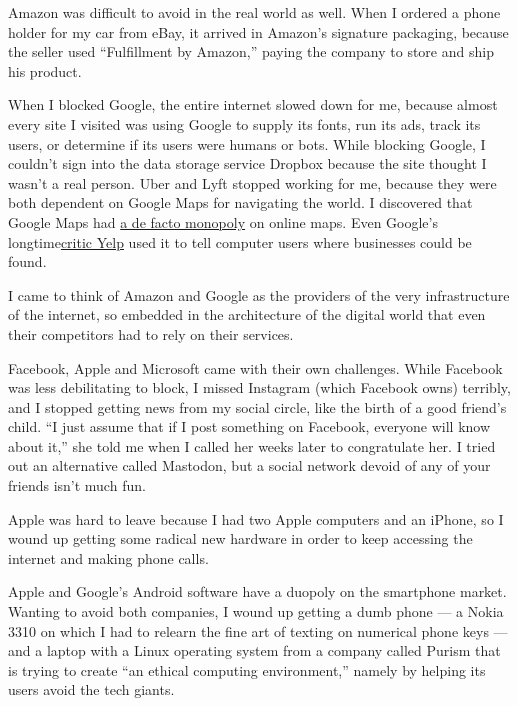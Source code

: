 Amazon was difficult to avoid in the real world as well. When I ordered
a phone holder for my car from eBay, it arrived in Amazon's signature
packaging, because the seller used ``Fulfillment by Amazon,'' paying the
company to store and ship his product.

When I blocked Google, the entire internet slowed down for me, because
almost every site I visited was using Google to supply its fonts, run
its ads, track its users, or determine if its users were humans or bots.
While blocking Google, I couldn't sign into the data storage service
Dropbox because the site thought I wasn't a real person. Uber and Lyft
stopped working for me, because they were both dependent on Google Maps
for navigating the world. I discovered that Google Maps had
\href{https://i.kinja-img.com/gawker-media/image/upload/c_scale,f_auto,fl_progressive,pg_1,q_80,w_1600/zrwbegnvl9qrpiyaerqv.png}{a
de facto monopoly} on online maps. Even Google's
longtime\href{https://www.nytimes3xbfgragh.onion/2017/07/01/technology/yelp-google-european-union-antitrust.html}{critic
Yelp} used it to tell computer users where businesses could be found.

I came to think of Amazon and Google as the providers of the very
infrastructure of the internet, so embedded in the architecture of the
digital world that even their competitors had to rely on their services.

Facebook, Apple and Microsoft came with their own challenges. While
Facebook was less debilitating to block, I missed Instagram (which
Facebook owns) terribly, and I stopped getting news from my social
circle, like the birth of a good friend's child. ``I just assume that if
I post something on Facebook, everyone will know about it,'' she told me
when I called her weeks later to congratulate her. I tried out an
alternative called Mastodon, but a social network devoid of any of your
friends isn't much fun.

Apple was hard to leave because I had two Apple computers and an iPhone,
so I wound up getting some radical new hardware in order to keep
accessing the internet and making phone calls.

Apple and Google's Android software have a duopoly on the smartphone
market. Wanting to avoid both companies, I wound up getting a dumb phone
--- a Nokia 3310 on which I had to relearn the fine art of texting on
numerical phone keys --- and a laptop with a Linux operating system from
a company called Purism that is trying to create ``an ethical computing
environment,'' namely by helping its users avoid the tech giants.

